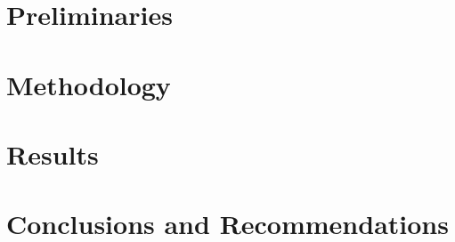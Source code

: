 \documentclass[a4paper,10pt,twoside]{report}
\begin{document}

\chapter{Preliminaries}\label{chapter:preliminaries}



% 


\chapter{Methodology}\label{chapter:methodology}


\chapter{Results}\label{chapter:results}



\chapter{Conclusions and Recommendations}\label{chapter:conclusions}



%
% 
% 




\appendix
{}


\end{document}
